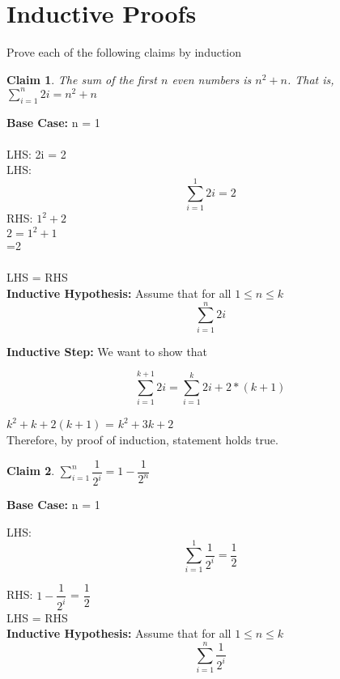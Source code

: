 \documentclass{article}
\newtheorem{claim}{Claim}
\begin{document}
    \section{Inductive Proofs}

    Prove each of the following claims by induction

    \begin{claim}
      The sum of the first $n$ even numbers is $n^2+n$.  That is, $\sum\limits_{i=1}^n 2i = n^2 + n$
    \end{claim}

      \textbf{Base Case:} n = 1 \\ \\
      LHS: 2i = 2 \\
      LHS: \[ \sum_{i=1}^{1} 2i = 2 \]
      RHS: $1^2 + 2$ \\

    $2 = 1^2 + 1$  \\
    =2 \\ \\

      LHS = RHS  \\

      \textbf{Inductive Hypothesis:} Assume that for all $1 \leq n \leq k$ \\
      \[ \sum_{i=1}^{n} 2i \]


     \textbf{Inductive Step:}
      We want to show that

      \[ \sum_{i=1}^{k+1} 2i = \sum_{i=1}^{k} 2i + 2*(k+1) \]

      $k^2 + k + 2(k+1)$
      = $k^2 + 3k + 2$ \\

    Therefore, by proof of induction, statement holds true.\\


    \begin{claim}
      $\sum\limits_{i=1}^{n} \dfrac{1}{2^i} = 1 - \dfrac{1}{2^n}$
    \end{claim}

      \textbf{Base Case:}  n = 1

      LHS: \[ \sum_{i=1}^{1} \dfrac{1}{2^i} = \dfrac{1}{2} \]

      RHS: $1-\dfrac{1}{2^i}$ = $\dfrac{1}{2}$\\

      LHS = RHS \\

      \textbf{Inductive Hypothesis:} Assume that for all $1 \leq n \leq k$
      \[ \sum_{i=1}^{n} \dfrac{1}{2^i} \]
\end{document}
